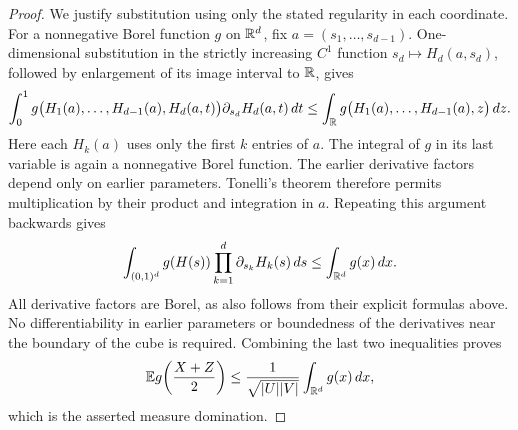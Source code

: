 \begin{proof}
We justify substitution using only the stated regularity in each
coordinate. For a nonnegative Borel function $g$ on $\mathbb R^d$, fix
$a=(s_1,\ldots,s_{d-1})$. One-dimensional substitution in the strictly
increasing $C^1$ function $s_d\mapsto H_d(a,s_d)$, followed by enlargement
of its image interval to $\mathbb R$, gives
\[
  \int_0^1 g\bigl(H_1(a),\ldots,H_{d-1}(a),H_d(a,t)\bigr)
                 \partial_{s_d}H_d(a,t)\,dt
  \le \int_{\mathbb R}g\bigl(H_1(a),\ldots,H_{d-1}(a),z\bigr)\,dz.
\]
Here each $H_k(a)$ uses only the first $k$ entries of $a$.
The integral of $g$ in its last variable is again a nonnegative Borel
function. The earlier derivative factors depend only on earlier
parameters. Tonelli's theorem therefore permits multiplication by their
product and integration in $a$. Repeating this argument backwards gives
\[
  \int_{(0,1)^d}g(H(s))
       \prod_{k=1}^d\partial_{s_k}H_k(s)\,ds
  \le \int_{\mathbb R^d}g(x)\,dx.
\]
All derivative factors are Borel, as also follows from their explicit
formulas above. No differentiability in earlier parameters or boundedness
of the derivatives near the boundary of the cube is required.
Combining the last two inequalities proves
\[
  \mathbb E g\!\left(\frac{X+Z}{2}\right)
  \le \frac{1}{\sqrt{|U||V|}}\int_{\mathbb R^d}g(x)\,dx,
\]
which is the asserted measure domination.
\end{proof}

